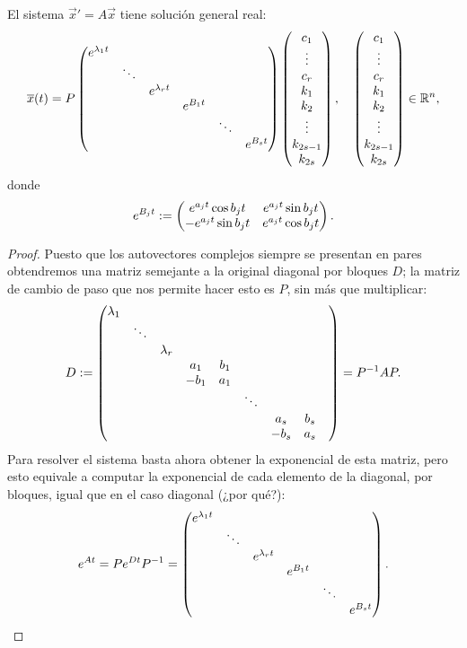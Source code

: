 \documentclass[../ecuaciones_diferenciales.tex]{subfiles}
\begin{document}
\begin{theorem}
	El sistema \(\vec{x}' = A\vec{x}\) tiene solución general real:
	\[\overline{x}(t) = P
		\begin{pmatrix}e^{\lambda_1 t} & & & & & \\
			& \ddots & & & & \\
			& & e^{\lambda_r t} & & & \\
			& & & e^{B_1 t} & & \\
			& & & & \ddots & \\
			& & & & & e^{B_s t}\end{pmatrix}
		\begin{pmatrix}c_1 \\ \vdots \\ c_r \\ k_1 \\ k_2 \\ \vdots \\ k_{2s-1}\\ k_{2s}\end{pmatrix},
		\quad 
		\begin{pmatrix}c_1 \\ \vdots \\ c_r \\ k_1 \\ k_2 \\ \vdots \\ k_{2s-1}\\ k_{2s}\end{pmatrix}
		\in \mathbb{R}^n,\]
	donde
	\[e^{B_j t} := \begin{pmatrix}e^{a_j t} \cos b_j t & e^{a_j t} \sin b_j t \\
		-e^{a_j t} \sin b_j t & e^{a_j t} \cos b_j t\end{pmatrix}.\]
\end{theorem}

\begin{proof}
	Puesto que los autovectores complejos siempre se presentan en
	pares obtendremos una matriz semejante a la original diagonal por bloques
	\(D\); la matriz de cambio de paso que nos permite hacer esto es \(P\), 
	sin más que multiplicar:
	\[D := \begin{pmatrix}\lambda_1 & & & & & & & \\
		& \ddots & & & & & & \\
		& & \lambda_r & & & & & \\
		& & & a_1 & b_1 & & & & \\
		& & & -b_1 & a_1 & & & & \\
		& & & & & \ddots & & \\
		& & & & & & a_s & b_s \\
		& & & & & & -b_s & a_s\end{pmatrix} = P^{-1}AP.\]
	Para resolver el sistema basta ahora obtener la exponencial de esta matriz,
	pero esto equivale a computar la exponencial de cada elemento de la diagonal,
	por bloques, igual que en el caso diagonal (¿por qué?):
	\[e^{A t} = P e^{D t} P^{-1} =
		\begin{pmatrix}e^{\lambda_1 t} & & & & & \\
			& \ddots & & & & \\
			& & e^{\lambda_r t} & & & \\
			& & & e^{B_1 t} & & \\
			& & & & \ddots & \\
			& & & & & e^{B_s t}\end{pmatrix}.\]
\end{proof}
\end{document}
